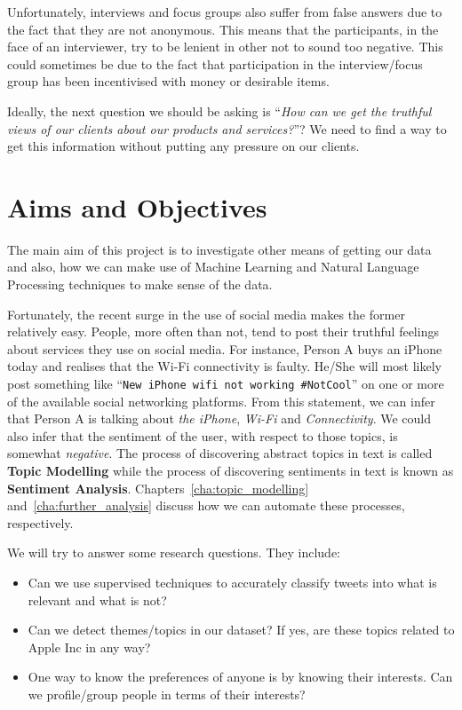 Unfortunately, interviews and focus groups also suffer from false answers due to the fact that they
are not anonymous. This means that the participants, in the face of an interviewer, try to be
lenient in other not to sound too negative. This could sometimes be due to the fact that
participation in the interview/focus group has been incentivised with money or desirable items.

Ideally, the next question we should be asking is ``\textit{How can we get the truthful views of our
clients about our products and services?}''? We need to find a way to get this information without
putting any pressure on our clients.

\section{Aims and Objectives}
\label{sec:objectives}
The main aim of this project is to investigate other means of getting our data and also, how we can
make use of Machine Learning and Natural Language Processing techniques to make sense of the data.

Fortunately, the recent surge in the use of social media makes the former relatively easy. People,
more often than not, tend to post their truthful feelings about services they use on social media.
For instance, Person A buys an iPhone today and realises that the Wi-Fi connectivity is faulty.
He/She will most likely post something like ``\texttt{New iPhone wifi not working \#NotCool}'' on
one or more of the available social networking platforms. From this statement, we can infer that
Person A is talking about \textit{the iPhone}, \textit{Wi-Fi} and \textit{Connectivity}. We could
also infer that the sentiment of the user, with respect to those topics, is somewhat
\textit{negative}. The process of discovering abstract topics in text is called \textbf{Topic
Modelling} while the process of discovering sentiments in text is known as \textbf{Sentiment
Analysis}. Chapters~\ref{cha:topic_modelling} and~\ref{cha:further_analysis} discuss how we can
automate these processes, respectively.

We will try to answer some research questions. They include:
\begin{itemize}
  \item Can we use supervised techniques to accurately classify tweets into what is relevant and
    what is not?
  \item Can we detect themes/topics in our dataset? If yes, are these topics related to Apple Inc in
    any way?
  \item One way to know the preferences of anyone is by knowing their interests. Can we
    profile/group people in terms of their interests?
\end{itemize}


